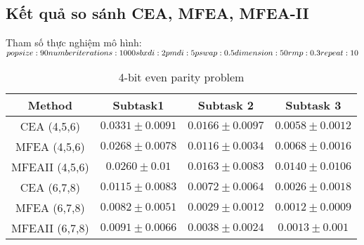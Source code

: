 
\subsection{Kết quả so sánh CEA, MFEA, MFEA-II}

  Tham số thực nghiệm mô hình: \\
$pop size: 90\\
numberiterations: 1000\\
sbxdi: 2\\
pmdi: 5\\
pswap: 0.5\\
dimension: 50\\
rmp: 0.3\\
repeat: 10\\
$

\begin{table}
	\caption{4-bit even parity problem}
    \begin{center}
    \begin{tabular}{|c|c|c|c|}
    \hline
    \multirow{1}{*}{\textbf{Method}} & \multicolumn{1}{c|}{\textbf{Subtask1}} & \multicolumn{1}{c|}{\textbf{Subtask 2}} & \multicolumn{1}{c|}{\textbf{Subtask 3}} \\ \hline
    CEA (4,5,6) & $0.0331 \pm 0.0091 $& $0.0166 \pm 0.0097$ & $\mathbf{0.0058 \pm 0.0012}$ \\ 
    MFEA (4,5,6) & $0.0268 \pm 0.0078$ & $\mathbf{0.0116 \pm 0.0034}$ & $0.0068 \pm 0.0016$ \\ 
    MFEAII (4,5,6)  & $\mathbf{0.0260 \pm 0.01}$ & $0.0163 \pm 0.0083$ & $0.0140 \pm 0.0106$ \\ \hline
    CEA (6,7,8) & $0.0115 \pm 0.0083$ & $0.0072 \pm 0.0064$ & $0.0026 \pm 0.0018$ \\ 
    MFEA (6,7,8) & $\mathbf{0.0082 \pm 0.0051}$ & $\mathbf{0.0029 \pm 0.0012}$ & $\mathbf{0.0012 \pm 0.0009}$ \\ 
    MFEAII (6,7,8)  & $0.0091 \pm 0.0066$ & $0.0038 \pm 0.0024$ & $0.0013 \pm 0.001$ \\ \hline
    
    \end{tabular}
    \end{center}
    
    \label{tab:result:nbit}
   

\end{table}
